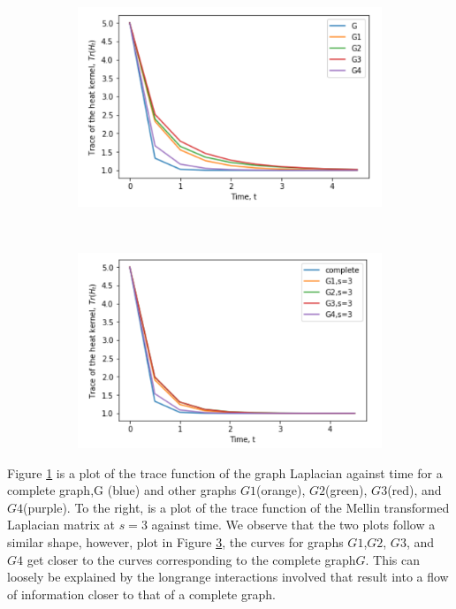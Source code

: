 \documentclass[10pt,a4paper]{article}
\begin{document}
	  \begin{figure}[H]
	  	\centering
	  	\begin{subfigure}[b]{0.45\textwidth}
	  		\includegraphics[width= \textwidth]{images/complete-L1.png}
	  		\caption{}
	  		\label{completeL1}
	  	\end{subfigure}~
	  	\begin{subfigure}[b]{0.45\textwidth}
	  		\includegraphics[width= \textwidth]{images/complete-mellins3.png}
	  		\caption{}
	  		\label{completeMellins3}
	  	\end{subfigure}
  	\end{figure}
      Figure \ref{completeL1} is a plot of the trace function of the graph Laplacian against time for a complete graph,G (blue) and other graphs $G1$(orange), $G2$(green), $G3$(red), and $G4$(purple). To the right, is a plot of the trace function of the Mellin transformed Laplacian matrix at $s=3$ against time. We observe that the two plots follow a similar shape, however, plot in Figure \ref{completeMellins3}, the curves for graphs $G1$,$G2$, $G3$, and $G4$ get closer to the curves corresponding to the complete graph$G$. This can loosely be explained by the longrange interactions involved that result into a flow of information closer to that of a complete graph.
  
\end{document}

